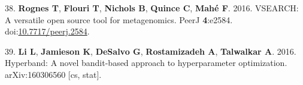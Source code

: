 \documentclass[11pt,]{article}
\begin{document}
\hypertarget{ref-rognes_vsearch_2016}{}
38. \textbf{Rognes T}, \textbf{Flouri T}, \textbf{Nichols B},
\textbf{Quince C}, \textbf{Mahé F}. 2016. VSEARCH: A versatile open
source tool for metagenomics. PeerJ \textbf{4}:e2584.
doi:\href{https://doi.org/10.7717/peerj.2584}{10.7717/peerj.2584}.

\hypertarget{ref-li_hyperband:_2016}{}
39. \textbf{Li L}, \textbf{Jamieson K}, \textbf{DeSalvo G},
\textbf{Rostamizadeh A}, \textbf{Talwalkar A}. 2016. Hyperband: A novel
bandit-based approach to hyperparameter optimization. arXiv:160306560
{[}cs, stat{]}.
\end{document}
